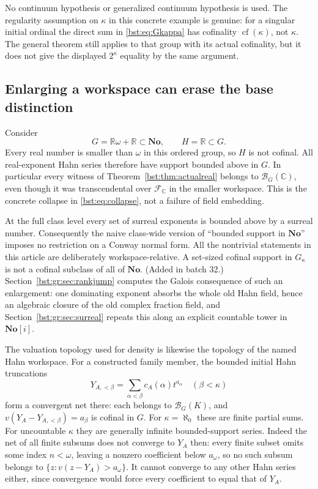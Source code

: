 \documentclass[11pt,letterpaper]{article}
\theoremstyle{definition}
\theoremstyle{remark}
\newcommand{\R}{\mathbb R}
\newcommand{\C}{\mathbb C}
\newcommand{\No}{\mathbf{No}}
\newcommand{\cof}{\operatorname{cf}}
\newcommand{\BB}[2]{\mathcal B_{#2}(#1)}
\begin{document}
No continuum hypothesis or generalized continuum hypothesis is used. The
regularity assumption on $\kappa$ in this concrete example is genuine:
for a singular initial ordinal the direct sum in \eqref{bst:eq:Gkappa} has
cofinality $\cof(\kappa)$, not $\kappa$. The general theorem still applies
to that group with its actual cofinality, but it does not give the displayed
$2^\kappa$ equality by the same argument.

\subsection{Enlarging a workspace can erase the base distinction}

Consider
\[
 G=\R\omega+\R\subset\No,\qquad H=\R\subset G.
\]
Every real number is smaller than $\omega$ in this ordered group, so $H$
is not cofinal. All real-exponent Hahn series therefore have support
bounded above in $G$. In particular every witness of
Theorem~\ref{bst:thm:actualreal} belongs to $\BB{\C}G$, even though it was
transcendental over $\mathscr F_\C$ in the smaller workspace. This is the
concrete collapse in \eqref{bst:eq:collapse}, not a failure of field embedding.

At the full class level every set of surreal exponents is bounded above by
a surreal number. Consequently the naive class-wide version of
``bounded support in $\No$'' imposes no restriction on a Conway normal form.
All the nontrivial statements in this article are deliberately
workspace-relative. A set-sized cofinal support in $G_\kappa$ is not a
cofinal subclass of all of $\No$.
(Added in batch 32.) Section~\ref{bst:gr:sec:rankjump} computes the Galois
consequence of such an enlargement: one dominating exponent absorbs the
whole old Hahn field, hence an algebraic closure of the old complex
fraction field, and Section~\ref{bst:gr:sec:surreal} repeats this along an
explicit countable tower in $\No[i]$.

The valuation topology used for density is likewise the topology of the
named Hahn workspace. For a constructed family member, the bounded initial
Hahn truncations
\[
 Y_{A,<\beta}=\sum_{\alpha<\beta}c_A(\alpha)t^{a_\alpha}
 \quad(\beta<\kappa)
\]
form a convergent net there: each belongs to $\BB KG$, and
$v(Y_A-Y_{A,<\beta})=a_\beta$ is cofinal in $G$.
For $\kappa=\aleph_0$ these are finite partial sums. For uncountable
$\kappa$ they are generally infinite bounded-support series.
Indeed the net of all finite subsums does not converge to $Y_A$ then:
every finite subset omits some index $n<\omega$, leaving a nonzero
coefficient below $a_\omega$, so no such subsum belongs to
$\{z:v(z-Y_A)>a_\omega\}$. It cannot converge to any other Hahn series
either, since convergence would force every coefficient to equal that of
$Y_A$.
\end{document}
